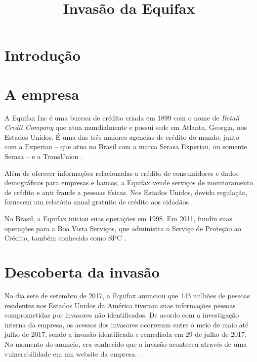 \documentclass[conference]{IEEEtran}
\begin{document}
\title{Invasão da Equifax}

\author{
}

\maketitle

\begin{abstract}

\end{abstract}

\begin{IEEEkeywords}

\end{IEEEkeywords}

\section{Introdução}

\section{A empresa}
A Equifax Inc é uma bureau de crédito criada em 1899 com o nome de \textit{Retail Credit Company} que atua mundialmente e possui sede em Atlanta, Georgia, nos Estados Unidos. 
É uma das três maiores agencias de crédito do mundo, junto com a Experian -- que atua no Brasil com a marca Serasa Experian,
ou somente Serasa -- e a TransUnion \cite{Roos2008}.

Além de oferecer informações relacionadas a crédito de consumidores e dados demográficos para empresas e bancos, a Equifax
vende serviços de monitoramento de crédito e anti fraude a pessoas físicas. Nos Estados Unidos, devido regulação, fornecem um
relatório anual gratuito de crédito aos cidadãos \cite{Roos2008} \cite{Garkinkel1995}. 

No Brasil, a Equifax iniciou suas operações em 1998. Em 2011, fundiu suas operações para a Boa Vista Serviços, que administra o Serviço de Proteção ao Crédito, também conhecido
como SPC \cite{BoaVista2018} \cite{Sandrini2011}. 

\section{Descoberta da invasão} 
No dia sete de setembro de 2017, a Equifax anunciou que 143 milhões de pessoas residentes nos Estados Unidos da América tiveram suas informações pessoas comprometidas por invasores 
não identificados. De acordo com a investigação interna da empresa, os acessos dos invasores ocorreram entre o meio de maio até julho de 2017, sendo a invasão identificada e remediada 
em 29 de julho de 2017. No momento do anuncio, era conhecido que a invasão aconteceu através de uma vulnerabilidade em um website da empresa. \cite{Carman2017} \cite{Equifax2017} \cite{Bernard2017} \cite{Moore2017}.
\end{document}
